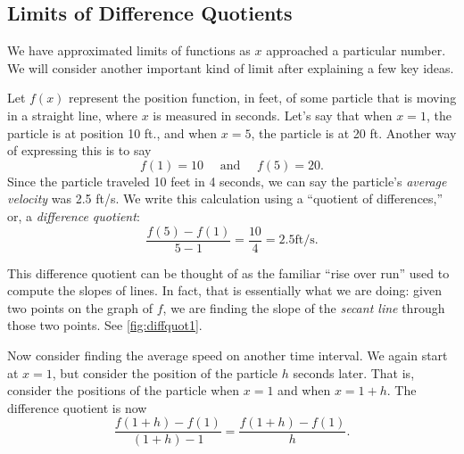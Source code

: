 \subsection{Limits of Difference Quotients}


We have approximated limits of functions as $x$ approached a particular number. We will consider another important kind of limit after explaining a few key ideas.

Let $f(x)$ represent the position function, in feet, of some particle that is moving in a straight line, where $x$ is measured in seconds. Let's say that when $x=1$, the particle is at position 10 ft., and when $x=5$, the particle is at 20 ft. Another way of expressing this is to say
\[f(1)=10 \quad \text{ and } \quad f(5) = 20.\]
Since the particle traveled 10 feet in 4 seconds, we can say the particle's \emph{average velocity} was 2.5 ft/s. We write this calculation using a ``quotient of differences,'' or, a \emph{difference quotient}:
\[\frac{f(5) - f(1)}{5-1} = \frac{10}4 = 2.5 \text{ft/s}.\]

This difference quotient can be thought of as the familiar ``rise over run'' used to compute the slopes of lines. In fact, that is essentially what we are doing: given two points on the graph of $f$, we are finding the slope of the \emph{secant line} through those two points. See \autoref{fig:diffquot1}.

Now consider finding the average speed on another time interval. We again start at $x=1$, but consider the position of the particle $h$ seconds later. That is, consider the positions of the particle when $x=1$ and when $x=1+h$. The difference quotient is now
\[\frac{f(1+h)-f(1)}{(1+h)-1} = \frac{f(1+h)-f(1)}h.\]

